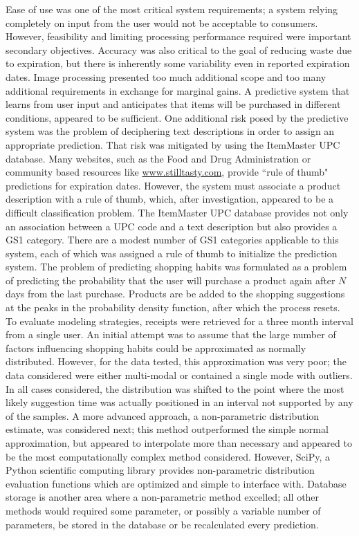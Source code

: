 \documentclass[11pt]{article} %
\begin{document}
\newline \quad \newline
Ease of use was one of the most critical system requirements; a system relying completely on input from the user would not be acceptable to consumers. However, feasibility and limiting processing performance required were important secondary objectives. Accuracy was also critical to the goal of reducing waste due to expiration, but there is inherently some variability even in reported expiration dates. Image processing presented too much additional scope and too many additional requirements in exchange for marginal gains. A predictive system that learns from user input and anticipates that items will be purchased in different conditions, appeared to be sufficient. One additional risk posed by the predictive system was the problem of deciphering text descriptions in order to assign an appropriate prediction. That risk was mitigated by using the ItemMaster UPC database. Many websites, such as the Food and Drug Administration or community based resources like \url{www.stilltasty.com}, provide ``rule of thumb"  predictions for expiration dates. However, the system must associate a product description with a rule of thumb, which, after investigation, appeared to be a difficult classification problem. The ItemMaster UPC database provides not only an association between a UPC code and a text description but also provides a GS1 category. There are a modest number of GS1 categories applicable to this system, each of which was assigned a rule of thumb to initialize the prediction system.
\newline \quad \newline
The problem of predicting shopping habits was formulated as a problem of predicting the probability that the user will purchase a product again after $N$ days from the last purchase. Products are be added to the shopping suggestions at the peaks in the probability density function, after which the process resets. To evaluate modeling strategies, receipts were retrieved for a three month interval from a single user. An initial attempt was to assume that the large number of factors influencing shopping habits could be approximated as normally distributed. However, for the data tested, this approximation was very poor; the data considered were either multi-modal or contained a single mode with outliers. In all cases considered, the distribution was shifted to the point where the most likely suggestion time was actually positioned in an interval not supported by any of the samples. A more advanced approach, a non-parametric distribution estimate, was considered next; this method outperformed the simple normal approximation, but appeared to interpolate more than necessary and appeared to be the most computationally complex method considered. However, SciPy, a Python scientific computing library provides non-parametric distribution evaluation functions which are optimized and simple to interface with. Database storage is another area where a non-parametric method excelled; all other methods would required some parameter, or possibly a variable number of parameters, be stored in the database or be recalculated every prediction. 
\end{document}
